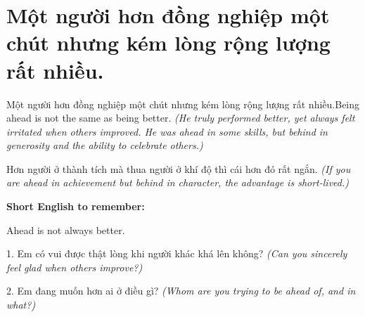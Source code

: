 \section{Một người hơn đồng nghiệp một chút nhưng kém lòng rộng lượng rất nhiều.}
\begin{truyen}{Một người hơn đồng nghiệp một chút nhưng kém lòng rộng lượng rất nhiều.}{Being ahead is not the same as being better.}
\textit{(He truly performed better, yet always felt irritated when others improved. He was ahead in some skills, but behind in generosity and the ability to celebrate others.)}
\end{truyen}
\begin{baihoc}
Hơn người ở thành tích mà thua người ở khí độ thì cái hơn đó rất ngắn.
\textit{(If you are ahead in achievement but behind in character, the advantage is short-lived.)}
\end{baihoc}
\begin{ghinhoanh}\textbf{Short English to remember:}

Ahead is not always better.
\end{ghinhoanh}
\begin{tuhocnhanh}
1. Em có vui được thật lòng khi người khác khá lên không? \textit{(Can you sincerely feel glad when others improve?)}

2. Em đang muốn hơn ai ở điều gì? \textit{(Whom are you trying to be ahead of, and in what?)}
\end{tuhocnhanh}
\ngancach

